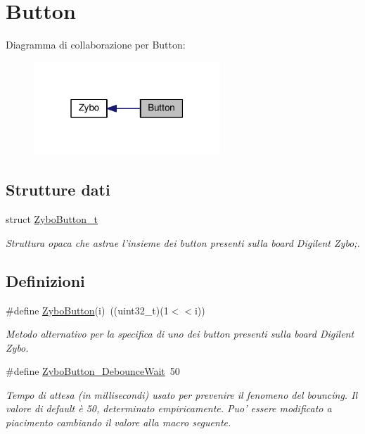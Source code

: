\hypertarget{group___button}{\section{Button}
\label{group___button}
}
Diagramma di collaborazione per Button\+:
\nopagebreak
\begin{figure}[H]
\begin{center}
\leavevmode
\includegraphics[width=199pt]{group___button}
\end{center}
\end{figure}
\subsection*{Strutture dati}
\begin{DoxyCompactItemize}
\item 
struct \hyperlink{struct_zybo_button__t}{Zybo\+Button\+\_\+t}
\begin{DoxyCompactList}\small\item\em Struttura opaca che astrae l'insieme dei button presenti sulla board Digilent Zybo;. \end{DoxyCompactList}\end{DoxyCompactItemize}
\subsection*{Definizioni}
\begin{DoxyCompactItemize}
\item 
\#define \hyperlink{group___button_ga5f85cbc14732f1d83faa75500b67defa}{Zybo\+Button}(i)~((uint32\+\_\+t)(1$<$$<$i))
\begin{DoxyCompactList}\small\item\em Metodo alternativo per la specifica di uno dei button presenti sulla board Digilent Zybo. \end{DoxyCompactList}\item 
\#define \hyperlink{group___button_ga8960eefa6a431f50d4fe2a2f8063da3f}{Zybo\+Button\+\_\+\+Debounce\+Wait}~50
\begin{DoxyCompactList}\small\item\em Tempo di attesa (in millisecondi) usato per prevenire il fenomeno del bouncing. Il valore di default è 50, determinato empiricamente. Puo' essere modificato a piacimento cambiando il valore alla macro seguente. \end{DoxyCompactList}\end{DoxyCompactItemize}
